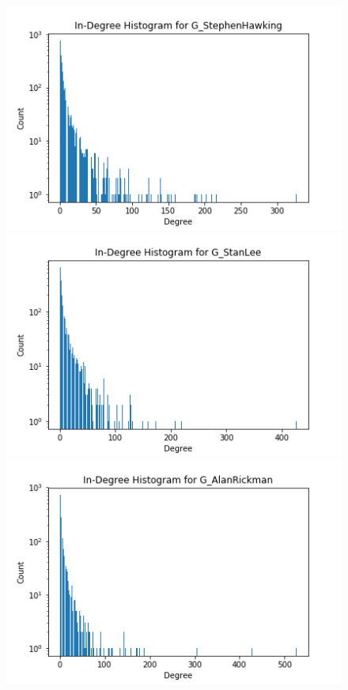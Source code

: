 \documentclass[conference]{IEEEtran}
\begin{document}
\begin{figure}[!htb]
  \includegraphics[width=\linewidth]{degreeinSH.png}
\endminipage\hfill
{}
  \includegraphics[width=\linewidth]{degreeinSL.png}
\endminipage\hfill
{}%
  \includegraphics[width=\linewidth]{degreeinAR.png}
\endminipage


\end{figure}
\end{document}
